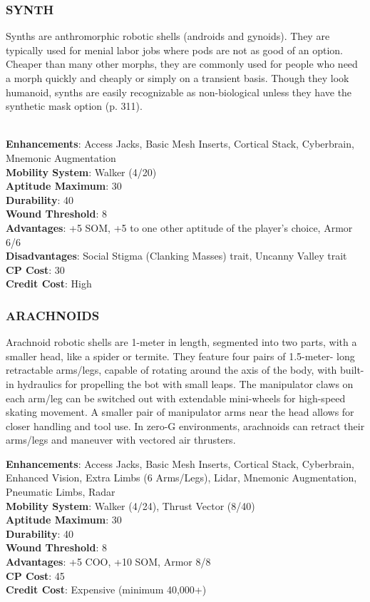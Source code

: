 \subsubsection{SYNTH}
Synths are anthromorphic robotic shells (androids and gynoids). They are
typically used for menial labor jobs where pods are not as good of an option.
Cheaper than many other morphs, they are commonly used for people who need a
morph quickly and cheaply or simply on a transient basis. Though they look
humanoid, synths are easily recognizable as non-biological unless they have the
synthetic mask option (p. 311).

\\ \textbf{Enhancements}: Access Jacks, Basic Mesh Inserts, Cortical Stack, Cyberbrain, Mnemonic Augmentation
\\ \textbf{Mobility System}: Walker (4/20)
\\ \textbf{Aptitude Maximum}: 30
\\ \textbf{Durability}: 40
\\ \textbf{Wound Threshold}: 8
\\ \textbf{Advantages}: +5 SOM, +5 to one other aptitude of the player’s choice, Armor 6/6
\\ \textbf{Disadvantages}: Social Stigma (Clanking Masses) trait, Uncanny Valley trait
\\ \textbf{CP Cost}: 30
\\ \textbf{Credit Cost}: High

\subsubsection{ARACHNOIDS}
Arachnoid robotic shells are 1-meter in length, segmented into two parts, with
a smaller head, like a spider or termite. They feature four pairs of 1.5-meter-
long retractable arms/legs, capable of rotating around the axis of the body,
with built-in hydraulics for propelling the bot with small leaps. The
manipulator claws on each arm/leg can be switched out with extendable
mini-wheels for high-speed skating movement. A smaller pair of manipulator arms
near the head allows for closer handling and tool use. In zero-G environments,
arachnoids can retract their arms/legs and maneuver with vectored air
thrusters.

\textbf{Enhancements}: Access Jacks, Basic Mesh Inserts, Cortical Stack, Cyberbrain, Enhanced Vision, Extra Limbs (6 Arms/Legs), Lidar, Mnemonic Augmentation, Pneumatic Limbs, Radar \\
\textbf{Mobility System}: Walker (4/24), Thrust Vector (8/40) \\
\textbf{Aptitude Maximum}: 30 \\
\textbf{Durability}: 40 \\
\textbf{Wound Threshold}: 8 \\
\textbf{Advantages}: +5 COO, +10 SOM, Armor 8/8 \\
\textbf{CP Cost}: 45 \\
\textbf{Credit Cost}: Expensive (minimum 40,000+)

